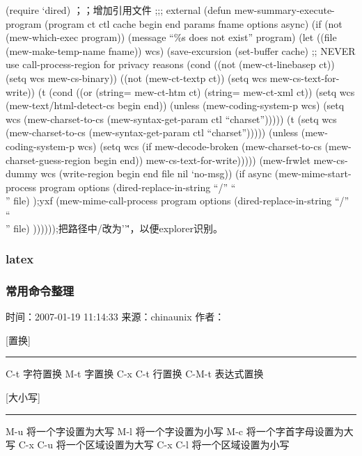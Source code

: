 \documentclass[11pt]{article}
\begin{document}
\begin{itemize}
(require `dired) ；；增加引用文件
;;; external
(defun mew-summary-execute-program (program ct ctl cache begin end params fname options async)
  (if (not (mew-which-exec program))
      (message ``\%s does not exist'' program)
    (let ((file (mew-make-temp-name fname))
   wcs)
      (save-excursion
 (set-buffer cache)
 ;; NEVER use call-process-region for privacy reasons
 (cond
  ((not (mew-ct-linebasep ct))
   (setq wcs mew-cs-binary))
  ((not (mew-ct-textp ct))
   (setq wcs mew-cs-text-for-write))
  (t
   (cond
    ((or (string= mew-ct-htm ct) (string= mew-ct-xml ct))
     (setq wcs (mew-text/html-detect-cs begin end))
     (unless (mew-coding-system-p wcs)
       (setq wcs (mew-charset-to-cs
    (mew-syntax-get-param ctl ``charset'')))))
    (t
     (setq wcs (mew-charset-to-cs
         (mew-syntax-get-param ctl ``charset'')))))
   (unless (mew-coding-system-p wcs)
     (setq wcs (if mew-decode-broken
     (mew-charset-to-cs
      (mew-charset-guess-region
       begin end))
   mew-cs-text-for-write)))))
 (mew-frwlet mew-cs-dummy wcs
   (write-region begin end file nil `no-msg))
 (if async
     (mew-mime-start-process program options (dired-replace-in-string ``/'' ``\\'' file) );yxf
   (mew-mime-call-process program options (dired-replace-in-string ``/'' ``\\'' file) ))))));把路径中/改为''\''，以便explorer识别。
\end{itemize} %
\subsubsection{latex}
\label{sec-2.1}


\subsubsection{常用命令整理}
\label{sec-2.2}

时间：2007-01-19 11:14:33  来源：chinaunix  作者：

                    



[置换]
\hrule
C-t                    字符置换                           
M-t                    字置换                             
C-x C-t                行置换                             
C-M-t                  表达式置换                         





[大小写]
\hrule
M-u                    将一个字设置为大写                     
M-l                    将一个字设置为小写                     
M-c                    将一个字首字母设置为大写                 
C-x C-u                将一个区域设置为大写                   
C-x C-l                将一个区域设置为小写                   
\end{document}
